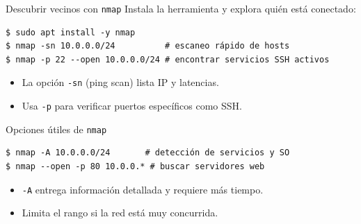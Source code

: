 \documentclass[aspectratio=169,professionalfonts]{beamer}
\begin{document}
\begin{frame}[fragile]{Descubrir vecinos con \texttt{nmap}}
  Instala la herramienta y explora quién está conectado:
  \begin{verbatim}
$ sudo apt install -y nmap
$ nmap -sn 10.0.0.0/24          # escaneo rápido de hosts
$ nmap -p 22 --open 10.0.0.0/24 # encontrar servicios SSH activos
  \end{verbatim}
  \begin{itemize}
    \item La opción \texttt{-sn} (ping scan) lista IP y latencias.
    \item Usa \texttt{-p} para verificar puertos específicos como SSH.
  \end{itemize}
\end{frame}


\begin{frame}[fragile]{Opciones útiles de \texttt{nmap}}
  \begin{verbatim}
$ nmap -A 10.0.0.0/24       # detección de servicios y SO
$ nmap --open -p 80 10.0.0.* # buscar servidores web
  \end{verbatim}
  \begin{itemize}
    \item \texttt{-A} entrega información detallada y requiere más tiempo.
    \item Limita el rango si la red está muy concurrida.
  \end{itemize}
\end{frame}
\end{document}
